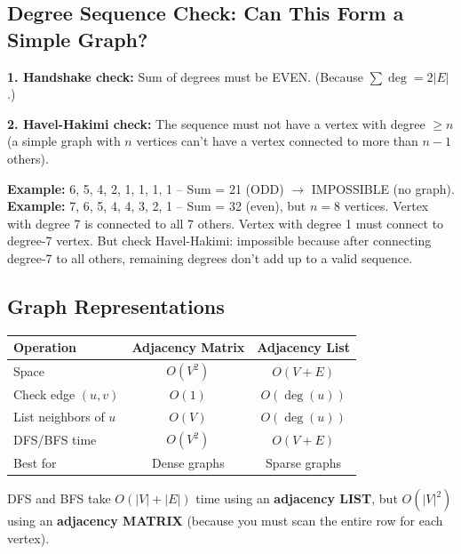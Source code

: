 \documentclass[12pt,portrait]{article}
\begin{document}
\subsection{Degree Sequence Check: Can This Form a Simple Graph?}

\begin{rulebox}
\textbf{1. Handshake check:} Sum of degrees must be EVEN. (Because $\sum\deg = 2|E|$.)

\textbf{2. Havel-Hakimi check:} The sequence must not have a vertex with degree $\geq n$ (a simple graph with $n$ vertices can't have a vertex connected to more than $n-1$ others).

\textbf{Example:} 6, 5, 4, 2, 1, 1, 1, 1 -- Sum = 21 (ODD) $\to$ IMPOSSIBLE (no graph).
\textbf{Example:} 7, 6, 5, 4, 4, 3, 2, 1 -- Sum = 32 (even), but $n=8$ vertices. Vertex with degree 7 is connected to all 7 others. Vertex with degree 1 must connect to degree-7 vertex. But check Havel-Hakimi: impossible because after connecting degree-7 to all others, remaining degrees don't add up to a valid sequence.
\end{rulebox}

\subsection{Graph Representations}

\begin{center}
\begin{tabular}{l|c|c}
\toprule
\textbf{Operation} & \textbf{Adjacency Matrix} & \textbf{Adjacency List} \\
\midrule
Space & $O(V^2)$ & $O(V+E)$ \\
Check edge $(u,v)$ & $O(1)$ & $O(\deg(u))$ \\
List neighbors of $u$ & $O(V)$ & $O(\deg(u))$ \\
DFS/BFS time & $O(V^2)$ & $O(V+E)$ \\
Best for & Dense graphs & Sparse graphs \\
\bottomrule
\end{tabular}
\end{center}

\begin{warningbox}
DFS and BFS take $O(|V|+|E|)$ time using an \textbf{adjacency LIST}, but $O(|V|^2)$ using an \textbf{adjacency MATRIX} (because you must scan the entire row for each vertex).
\end{warningbox}
\end{document}
